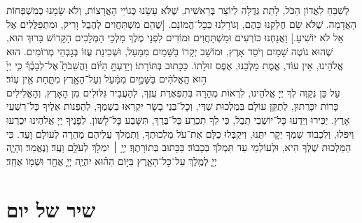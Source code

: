 \documentclass[twoside, openany, parskip=half, 11pt]{book}
\begin{document}

\uvaletzion

\\
\\


\label{end of shacharis}
\fullkaddish

\newcommand{\aleinu}{
\firstword{עָלֵֽינוּ}
לְשַׁבֵּחַ לַאֲדוֹן הַכֹּל, לָתֵת גְּדֻלָּה לְיוֹצֵר בְּרֵאשִׁית, שֶׁלֹּא עָשָׂנוּ כְּגוֹיֵי הָאֲרָצוֹת, וְלֹא שָׂמָנוּ כְּמִשְׁפְּחוֹת הָאֲדָמָה. שֶׁלֹּא שָׂם חֶלְקֵנוּ כָּהֶם, וְגוֹרָלֵנוּ כְּכׇל־הֲמוֹנָם. [שֶׁהֵם מִשְׁתַּחֲוִים לְהֶבֶל וָרִיק, וּמִתְפַּלֲּלִים אֶל אֵל לֹא יוֹשִׁיעַ.] וַאֲנַחְנוּ כּוֹרְעִים וּמִשְׁתַּחֲוִים וּמוֹדִים לִפְנֵי מֶלֶךְ מַלְכֵי הַמְּלָכִים הַקָּדוֹשׁ בָּרוּךְ הוּא, שֶׁהוּא נוֹטֶה שָׁמַיִם וְיֹסֵד אָרֶץ, וּמוֹשַׁב יְקָרוֹ בַּשָּׁמַיִם מִמַּעַל, וּשְׁכִינַת עֻזּוֹ בְּגׇבְהֵי מְרוֹמִים. הוּא אֱלֹהֵינוּ, אֵין עוֹד, אֱמֶת מַלְכֵּנוּ, אֶפֶס זוּלָתוֹ. כַּכָּתוּב בְּתּוֹרָתוֹ׃ וְיָדַעְתָּ֣
\source{דברים ד}
הַיּ֗וֹם וַהֲשֵׁבֹתָ֮ אֶל־לְבָבֶ֒ךָ֒ כִּ֤י יְיָ֙ ה֣וּא הָֽאֱלֹהִ֔ים בַּשָּׁמַ֣יִם מִמַּ֔עַל וְעַל־הָאָ֖רֶץ מִתָּ֑חַת אֵ֖ין עֽוֹד׃\\
עַל כֵּן נְקַוֶּה לְךָ יְיָ אֱלֹהֵינוּ, לִרְאוֹת מְהֵרָה בְּתִפְאֶרֶת עֻזֶּךָ, לְהַעֲבִיר גִּלּוּלִים מִן הָאָרֶץ, וְהָאֱלִילִים כָּרוֹת יִכָּרֵתוּן, לְתַקֵּן עוֹלָם בְּמַלְכוּת שַׁדַּי, וְכׇל־בְּנֵי בָשָׂר יִקְרְאוּ בִשְׁמֶךָ, לְהַפְנוֹת אֵלֶיךָ כָּל־רִשְׁעֵי אָרֶץ. יַכִּירוּ וְיֵדְעוּ כָּל־יוֹשְׁבֵי תֵבֵל, כִּי לְךָ תִכְרַע כָּל־בֶּרֶךְ, תִּשָּׁבַע כָּל־לָשׁוֹן. לְפָנֶיךָ יְיָ אֱלֹהֵינוּ יִכְרְעוּ וְיִפֹּלוּ, וְלִכְבוֹד שִׁמְךָ יְקָר יִתֵּנוּ, וִיקַבְּלוּ כֻלָּם אֶת־עֹל מַלְכוּתֶךָ, וְתִמְלֹךְ עֲלֵיהֶם מְהֵרָה לְעוֹלָם וָעֶד. כִּי הַמַּלְכוּת שֶׁלְּךָ הִיא, וּלְעוֹלְמֵי עַד תִּמְלֹךְ בְּכָבוֹד׃ כַּכָּתוּב בְּתוֹרָתֶךָ׃\source{שמות טו} יְיָ֥ ׀ יִמְלֹ֖ךְ לְעֹלָ֥ם וָעֶֽד׃ וְנֶאֱמַר׃\source{זכריה יד} וְהָיָ֧ה יְיָ֛ לְמֶ֖לֶךְ עַל־כׇּל־הָאָ֑רֶץ בַּיּ֣וֹם הַה֗וּא יִהְיֶ֧ה יְיָ֛ אֶחָ֖ד וּשְׁמ֥וֹ אֶחָֽד׃
}

\aleinu


\section[שיר של יום]{ שיר של יום }
\label{shir_shel_yom}
\newcommand{\shirshelyomintro}[1]{\begin{small}הַיּוֹם יוֹם #1 שֶׁבּוֹ הַלְוִיִּם הָיוּ אוֹמְרִים בְּבֵית־הַמִּקְדָּשׁ \end{small}}
\end{document}
